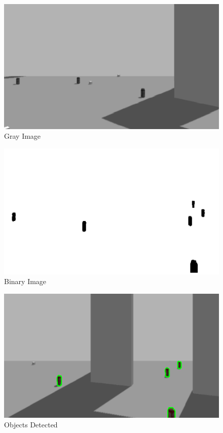 \documentclass[twoside,12pt,times,onecolumn,a4paper]{report}
\begin{document}
\begin{figure}[H]
  \centering
   \includegraphics[width=15cm]{gray}
  \caption{Gray Image}
\end{figure}

\begin{figure}[H]
  \centering
   \includegraphics[width=15cm]{binary}
  \caption{Binary Image}
\end{figure}

\begin{figure}[H]
  \centering
   \includegraphics[width=15cm]{detected}
  \caption{Objects Detected}
\end{figure}
\end{document}
